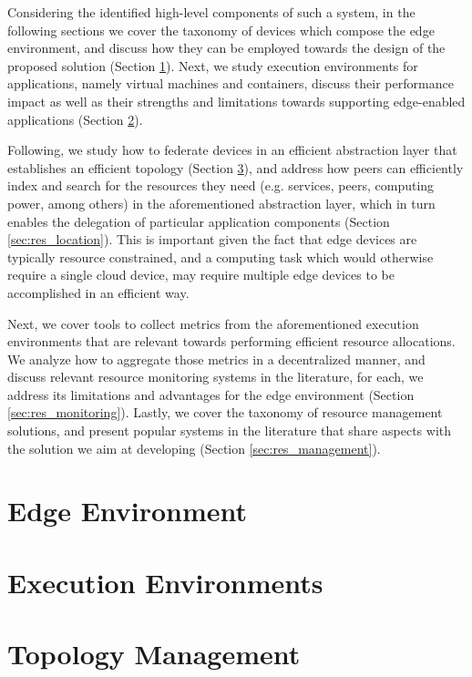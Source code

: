Considering the identified high-level components of such a system, in the following sections we cover the taxonomy of devices which compose the edge environment, and discuss how they can be employed towards the design of the proposed solution (Section \ref{sec:edge_computing}). Next, we study execution environments for applications, namely virtual machines and containers, discuss their performance impact as well as their strengths and limitations towards supporting edge-enabled applications (Section \ref{sec:runtime_environments}). 

Following, we study how to federate devices in an efficient abstraction layer  that establishes an efficient topology (Section \ref{sec:topology_management}), and address how peers can efficiently index and search for the resources they need (e.g. services, peers, computing power, among others) in the aforementioned abstraction layer, which in turn enables the delegation of particular application components (Section \ref{sec:res_location}). This is important given the fact that edge devices are typically resource constrained, and a computing task which would otherwise require a single cloud device, may require multiple edge devices to be accomplished in an efficient way. 

Next, we cover tools to collect metrics from the aforementioned execution environments that are relevant towards performing efficient resource allocations. We analyze how to aggregate those metrics in a decentralized manner, and discuss relevant resource monitoring systems in the literature, for each, we address its limitations and advantages for the edge environment (Section \ref{sec:res_monitoring}). Lastly, we cover the taxonomy of resource management solutions, and present popular systems in the literature that share aspects with the solution we aim at developing (Section \ref{sec:res_management}). 

\section{Edge Environment} \label{sec:edge_computing} 

\section{Execution Environments} \label{sec:runtime_environments} 

\section{Topology Management} \label{sec:topology_management} 

